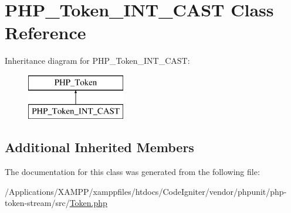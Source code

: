 \hypertarget{class_p_h_p___token___i_n_t___c_a_s_t}{}\section{P\+H\+P\+\_\+\+Token\+\_\+\+I\+N\+T\+\_\+\+C\+A\+ST Class Reference}
\label{class_p_h_p___token___i_n_t___c_a_s_t}
Inheritance diagram for P\+H\+P\+\_\+\+Token\+\_\+\+I\+N\+T\+\_\+\+C\+A\+ST\+:\begin{figure}[H]
\begin{center}
\leavevmode
\includegraphics[height=2.000000cm]{class_p_h_p___token___i_n_t___c_a_s_t}
\end{center}
\end{figure}
\subsection*{Additional Inherited Members}


The documentation for this class was generated from the following file\+:\begin{DoxyCompactItemize}
\item 
/\+Applications/\+X\+A\+M\+P\+P/xamppfiles/htdocs/\+Code\+Igniter/vendor/phpunit/php-\/token-\/stream/src/\mbox{\hyperlink{_token_8php}{Token.\+php}}\end{DoxyCompactItemize}

